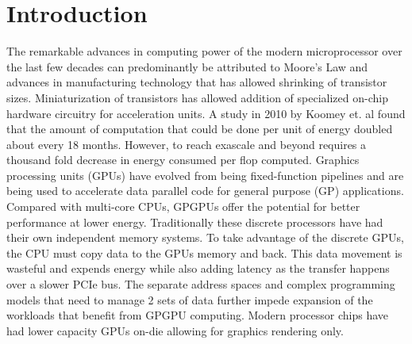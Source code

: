 \section{Introduction}\label{introduction}

\par The remarkable advances in computing power of the modern microprocessor over the last few decades can predominantly be attributed to Moore's Law and advances in manufacturing technology that has allowed shrinking of transistor sizes. Miniaturization of transistors has allowed addition of specialized on-chip hardware circuitry for acceleration units. A study in 2010 by Koomey et. al \cite{koomey} found that the amount of computation that could be done per unit of energy doubled about every 18 months. However, to reach exascale and beyond requires a thousand fold decrease in energy consumed per flop computed. Graphics processing units (GPUs) have evolved from being fixed-function pipelines and are being used to accelerate data parallel code for general purpose (GP) applications. Compared with multi-core CPUs, GPGPUs offer the potential for better performance at lower energy. Traditionally these discrete processors have had their own independent memory systems. To take advantage of the discrete GPUs, the CPU must copy data to the GPUs memory and back. This data movement is wasteful and expends energy while also adding latency as the transfer happens over a slower PCIe bus. The separate address spaces and complex programming models that need to manage 2 sets of data further impede expansion of the workloads that benefit from GPGPU computing. Modern processor chips have had lower capacity GPUs on-die allowing for graphics rendering only.
